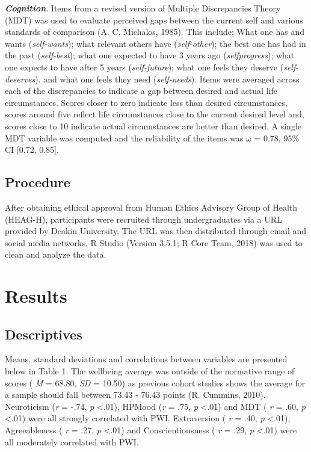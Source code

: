 \documentclass[man,floatsintext]{apa6}
\theoremstyle{definition}
\theoremstyle{definition}
\theoremstyle{definition}
\theoremstyle{remark}
\begin{document}
\textbf{\emph{Cognition}}. Items from a revised version of Multiple
Discrepancies Theory (MDT) was used to evaluate perceived gaps between
the current self and various standards of comparison (A. C. Michalos,
1985). This include: What one has and wants (\emph{self-wants}); what
relevant others have (\emph{self-other}); the best one has had in the
past (\emph{self-best}); what one expected to have 3 years ago
(\emph{selfprogress}); what one expects to have after 5 years
(\emph{self-future}); what one feels they deserve
(\emph{self-deserves}), and what one feels they need
(\emph{self-needs}). Items were averaged across each of the
discrepancies to indicate a gap between desired and actual life
circumstances. Scores closer to zero indicate less than desired
circumstances, scores around five reflect life circumstances close to
the current desired level and, scores close to 10 indicate actual
circumstances are better than desired. A single MDT variable was
computed and the reliability of the items was \(\omega\) = 0.78, 95\% CI
{[}0.72, 0.85{]}.

\subsection{Procedure}\label{procedure}

After obtaining ethical approval from Human Ethics Advisory Group of
Health (HEAG-H), participants were recruited through undergraduates via
a URL provided by Deakin University. The URL was then distributed
through email and social media networks. R Studio (Version 3.5.1; R Core
Team, 2018) was used to clean and analyze the data.

\section{Results}\label{results}

\subsection{Descriptives}\label{descriptives}

Means, standard deviations and correlations between variables are
presented below in Table 1. The wellbeing average was outside of the
normative range of scores ( \emph{M} = 68.80, \emph{SD} = 10.50) as
previous cohort studies shows the average for a sample should fall
between 73.43 - 76.43 points (R. Cummins, 2010). Neuroticism (\emph{r} =
-.74, \emph{p} \textless{}.01), HPMood (\emph{r} = .75, \emph{p}
\textless{}.01) and MDT ( \emph{r} = .60, \emph{p} \textless{}.01) were
all strongly correlated with PWI. Extraversion ( \emph{r} = .40,
\emph{p} \textless{}.01), Agreeableness ( \emph{r} = .27, \emph{p}
\textless{}.01) and Conscientiousness ( \emph{r} = .29, \emph{p}
\textless{}.01) were all moderately correlated with PWI.
\end{document}
